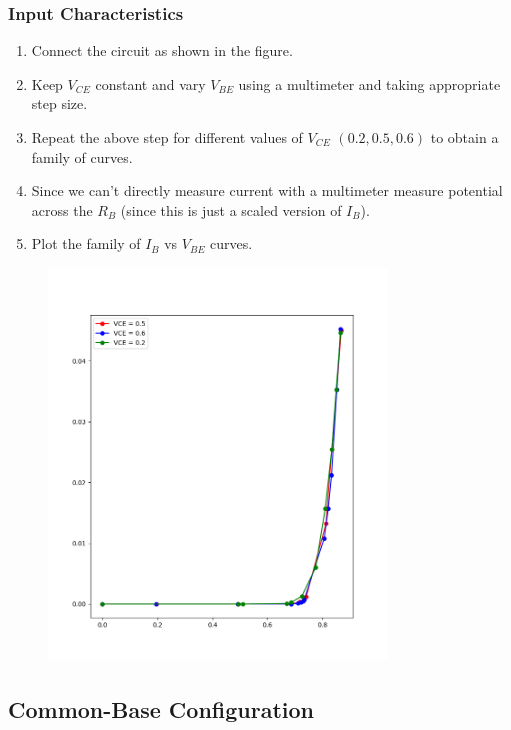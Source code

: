 \documentclass[12pt,a4paper]{article}
\begin{document}
\subsubsection{Input Characteristics}
\begin{enumerate}
    \item Connect the circuit as shown in the figure. 
    \item Keep $V_{CE}$ constant and vary $V_{BE}$ using a multimeter and taking appropriate step size.
    \item Repeat the above step for different values of $V_{CE}$ $(0.2, 0.5, 0.6)$ to obtain a family of curves.
    \item Since we can't directly measure current with a multimeter measure potential across the $R_B$ (since this is just a scaled version of $I_B$).
    \item Plot the family of $I_B$ vs $V_{BE}$ curves.
\end{enumerate}
\begin{figure}[H]
    \centering
    \includegraphics[width=0.8\textwidth]{Experiment_6/figs/ce_ip.png}
\end{figure}
\subsection{Common-Base Configuration}
\end{document}
